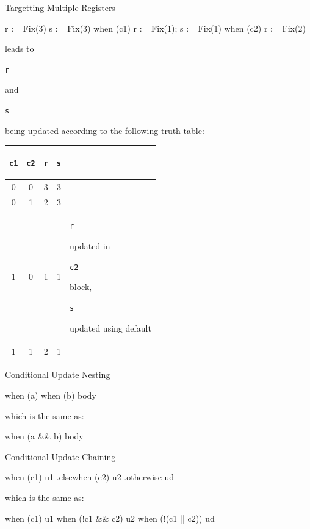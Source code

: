 \documentclass[xcolor=pdflatex,dvipsnames,table]{beamer}
\newcommand{\kode}[1]{\begin{footnotesize}{\tt #1}\end{footnotesize}}
\begin{document}
\begin{frame}[fragile]{Targetting Multiple Registers}

\begin{scala}
r := Fix(3) 
s := Fix(3)
when (c1) { r := Fix(1); s := Fix(1) }
when (c2) { r := Fix(2) }
\end{scala}

leads to \kode{r} and \kode{s} being updated according to the
following truth table:

{\footnotesize
\begin{center}
\begin{tabular}{|c|c|c|c|l|}
\hline
\kode{c1} & \kode{c2}  & \kode{r} & \kode{s} & \\
\hline 
0 &  0 & 3 & 3 & \\
0 &  1 & 2 & 3 & \\ 
1 &  0 & 1 & 1 & \kode{r} updated in \kode{c2} block, \kode{s} updated using default \\
1 &  1 & 2 & 1 & \\
\hline
\end{tabular}
\end{center}
}


\end{frame}

\begin{frame}[fragile]{Conditional Update Nesting}

\begin{scala}
when (a) { when (b) { body } }
\end{scala}

which is the same as:

\begin{scala}
when (a && b) { body }
\end{scala}

\end{frame}

\begin{frame}[fragile]{Conditional Update Chaining}

\begin{scala}
when (c1) { u1 }
.elsewhen (c2) { u2 }
.otherwise { ud }
\end{scala}

which is the same as:

\begin{scala}
when (c1) { u1 }
when (!c1 && c2) { u2 }
when (!(c1 || c2)) { ud }
\end{scala}

\end{frame}
\end{document}
